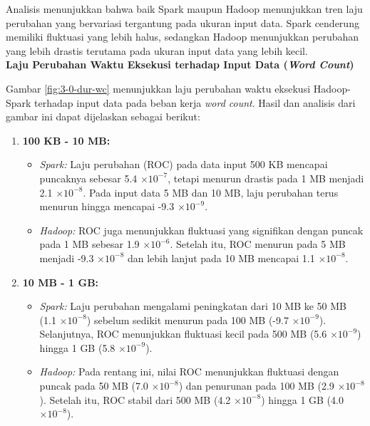 Analisis menunjukkan bahwa baik Spark maupun Hadoop menunjukkan tren laju perubahan yang bervariasi tergantung pada ukuran input data. Spark cenderung memiliki fluktuasi yang lebih halus, sedangkan Hadoop menunjukkan perubahan yang lebih drastis terutama pada ukuran input data yang lebih kecil.\\

\textbf{Laju Perubahan Waktu Eksekusi terhadap Input Data (\textit{Word Count})}

Gambar \ref{fig:3-0-dur-wc} menunjukkan laju perubahan waktu eksekusi Hadoop-Spark terhadap input data pada beban kerja \textit{word count}. Hasil dan analisis dari gambar ini dapat dijelaskan sebagai berikut:

\begin{enumerate}
\item \textbf{100 KB - 10 MB:}
\begin{itemize}
\item \textit{Spark:} Laju perubahan (ROC) pada data input 500 KB mencapai puncaknya sebesar 5.4 $\times 10^{-7}$, tetapi menurun drastis pada 1 MB menjadi 2.1 $\times 10^{-8}$. Pada input data 5 MB dan 10 MB, laju perubahan terus menurun hingga mencapai -9.3 $\times 10^{-9}$.
\item \textit{Hadoop:} ROC juga menunjukkan fluktuasi yang signifikan dengan puncak pada 1 MB sebesar 1.9 $\times 10^{-6}$. Setelah itu, ROC menurun pada 5 MB menjadi -9.3 $\times 10^{-8}$ dan lebih lanjut pada 10 MB mencapai 1.1 $\times 10^{-8}$.
\end{itemize}

\item \textbf{10 MB - 1 GB:}
\begin{itemize}
    \item \textit{Spark:} Laju perubahan mengalami peningkatan dari 10 MB ke 50 MB (1.1 $\times 10^{-8}$) sebelum sedikit menurun pada 100 MB (-9.7 $\times 10^{-9}$). Selanjutnya, ROC menunjukkan fluktuasi kecil pada 500 MB (5.6 $\times 10^{-9}$) hingga 1 GB (5.8 $\times 10^{-9}$).
    \item \textit{Hadoop:} Pada rentang ini, nilai ROC menunjukkan fluktuasi dengan puncak pada 50 MB (7.0 $\times 10^{-8}$) dan penurunan pada 100 MB (2.9 $\times 10^{-8}$). Setelah itu, ROC stabil dari 500 MB (4.2 $\times 10^{-8}$) hingga 1 GB (4.0 $\times 10^{-8}$).
\end{itemize}


\end{enumerate}
